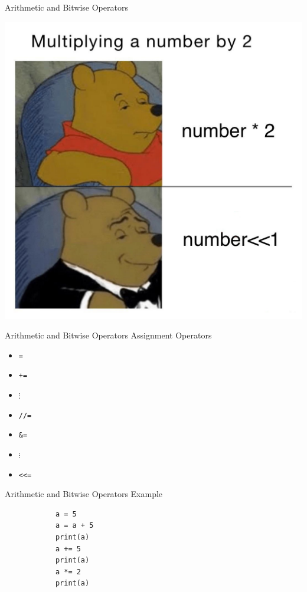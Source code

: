 \documentclass{beamer}
\begin{document}
    \begin{frame}{Arithmetic and Bitwise Operators}
        \begin{center}
            \includegraphics[scale = 0.25]{Bitwise_meme.jpg}
        \end{center}
    \end{frame}

    \begin{frame}{Arithmetic and Bitwise Operators}
        \color{blue} \Large Assignment Operators \\
        \color{black} \normalsize \vskip 10pt
        \begin{itemize}
            \item \texttt{=}
            \item \texttt{+=}
            \item $\vdots$
            \item \texttt{//=}
            \item \texttt{\&=}
            \item $\vdots$
            \item \texttt{<<=}
        \end{itemize}
    \end{frame}

    \begin{frame}[fragile]{Arithmetic and Bitwise Operators}
        \color{blue} \Large Example \\
        \color{black} \normalsize \vskip 10pt
        \begin{verbatim}
            a = 5
            a = a + 5
            print(a)
            a += 5
            print(a)
            a *= 2
            print(a)
        \end{verbatim}
    \end{frame}
\end{document}
